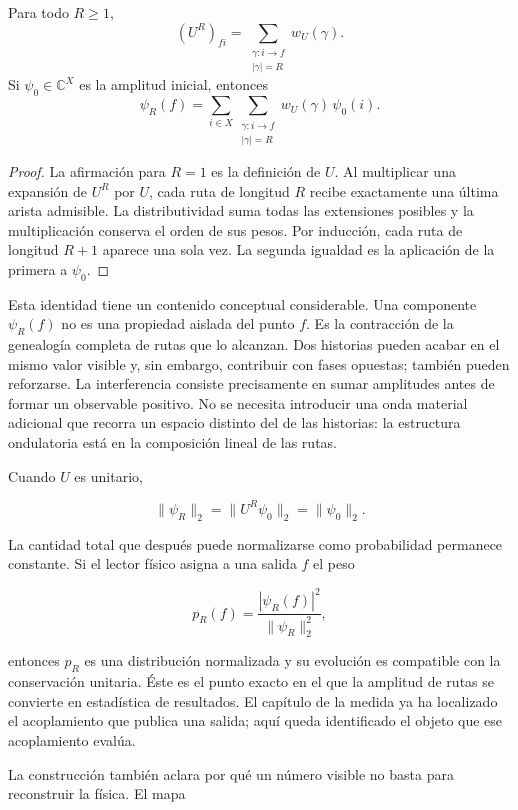 \begin{theorem}
Para todo \(R\geq 1\),
\[
  (U^R)_{fi}
  =
  \sum_{\substack{\gamma:i\to f\\|\gamma|=R}}
  w_U(\gamma).
\]
Si \(\psi_0\in\mathbb C^X\) es la amplitud inicial, entonces
\[
  \psi_R(f)
  =
  \sum_{i\in X}
  \sum_{\substack{\gamma:i\to f\\|\gamma|=R}}
  w_U(\gamma)\,\psi_0(i).
\]
\end{theorem}

\begin{proof}
La afirmación para \(R=1\) es la definición de \(U\). Al multiplicar una expansión
de \(U^R\) por \(U\), cada ruta de longitud \(R\) recibe exactamente una última
arista admisible. La distributividad suma todas las extensiones posibles y la
multiplicación conserva el orden de sus pesos. Por inducción, cada ruta de longitud
\(R+1\) aparece una sola vez. La segunda igualdad es la aplicación de la primera a
\(\psi_0\).
\end{proof}

Esta identidad tiene un contenido conceptual considerable. Una componente
\(\psi_R(f)\) no es una propiedad aislada del punto \(f\). Es la contracción de la
genealogía completa de rutas que lo alcanzan. Dos historias pueden acabar en el
mismo valor visible y, sin embargo, contribuir con fases opuestas; también pueden
reforzarse. La interferencia consiste precisamente en sumar amplitudes antes de
formar un observable positivo. No se necesita introducir una onda material
adicional que recorra un espacio distinto del de las historias: la estructura
ondulatoria está en la composición lineal de las rutas.

Cuando \(U\) es unitario,

\[
  \|\psi_R\|_2=\|U^R\psi_0\|_2=\|\psi_0\|_2.
\]

La cantidad total que después puede normalizarse como probabilidad permanece
constante. Si el lector físico asigna a una salida \(f\) el peso

\[
  p_R(f)=\frac{|\psi_R(f)|^2}{\|\psi_R\|_2^2},
\]

entonces \(p_R\) es una distribución normalizada y su evolución es compatible con
la conservación unitaria. Éste es el punto exacto en el que la amplitud de rutas se
convierte en estadística de resultados. El capítulo de la medida ya ha localizado
el acoplamiento que publica una salida; aquí queda identificado el objeto que ese
acoplamiento evalúa.

La construcción también aclara por qué un número visible no basta para reconstruir
la física. El mapa

